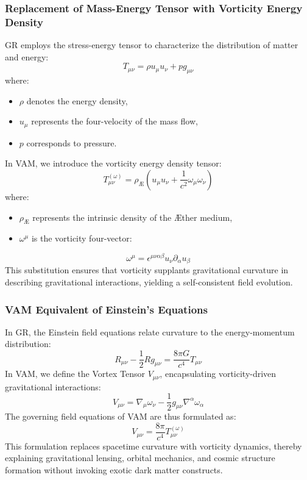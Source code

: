 \subsubsection*{Replacement of Mass-Energy Tensor with Vorticity Energy Density}
GR employs the stress-energy tensor to characterize the distribution of matter and energy:
\begin{equation}
    T_{\mu\nu} = \rho u_\mu u_\nu + p g_{\mu\nu}
\end{equation}
where:
\begin{itemize}
    \item $\rho$ denotes the energy density,
    \item $u_\mu$ represents the four-velocity of the mass flow,
    \item $p$ corresponds to pressure.
\end{itemize}
In VAM, we introduce the vorticity energy density tensor:
\begin{equation}
    T^{(\omega)}_{\mu\nu} = \rho_{\text{\AE}} \left( u_\mu u_\nu + \frac{1}{c^2} \omega_\mu \omega_\nu \right)
\end{equation}
where:
\begin{itemize}
    \item $\rho_{\text{\AE}}$ represents the intrinsic density of the \AE ther medium,
    \item $\omega^\mu$ is the vorticity four-vector:
\end{itemize}
\begin{equation}
    \omega^\mu = \epsilon^{\mu\nu\alpha\beta} u_\nu \partial_\alpha u_\beta
\end{equation}
This substitution ensures that vorticity supplants gravitational curvature in describing gravitational interactions, yielding a self-consistent field evolution.

\subsubsection*{VAM Equivalent of Einstein’s Equations}
In GR, the Einstein field equations relate curvature to the energy-momentum distribution:
\begin{equation}
    R_{\mu\nu} - \frac{1}{2} R g_{\mu\nu} = \frac{8\pi G}{c^4} T_{\mu\nu}
\end{equation}
In VAM, we define the Vortex Tensor $V_{\mu\nu}$, encapsulating vorticity-driven gravitational interactions:
\begin{equation}
    V_{\mu\nu} = \nabla_\mu \omega_\nu - \frac{1}{2} g_{\mu\nu} \nabla^\alpha \omega_\alpha
\end{equation}
The governing field equations of VAM are thus formulated as:
\begin{equation}
    V_{\mu\nu} = \frac{8\pi}{c^4} T^{(\omega)}_{\mu\nu}
\end{equation}
This formulation replaces spacetime curvature with vorticity dynamics, thereby explaining gravitational lensing, orbital mechanics, and cosmic structure formation without invoking exotic dark matter constructs.

